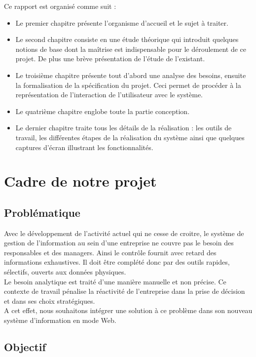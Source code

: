 \documentclass[a4paper,10pt]{article}
\begin{document}
\par
Ce rapport est organisé comme suit :\\
\begin{itemize}

\item Le premier chapitre  présente  l'organisme  d'accueil  et le sujet à traiter.
\item Le second chapitre  consiste en une étude théorique  qui introduit quelques notions de base dont la maîtrise  est indispensable  pour le déroulement  de ce projet.  De plus une brève présentation de l'étude  de l'existant.
\item Le troisième  chapitre  présente  tout  d'abord  une  analyse  des besoins, ensuite  la formalisation de la spécification  du projet. Ceci permet de procéder à la représentation de l'interaction de l'utilisateur avec le système.
\item Le quatrième  chapitre  englobe toute  la partie  conception.
\item Le dernier  chapitre  traite  tous  les détails  de la réalisation : les outils  de travail, les différentes étapes de la réalisation  du système ainsi que quelques captures  d'écran illustrant les fonctionnalités.
\end{itemize}
\newpage
\section{Cadre de notre projet}

\subsection{Problématique}

Avec le développement de l’activité actuel qui ne cesse de croitre, le système de gestion de l’information au sein d’une entreprise ne couvre pas le besoin des responsables et des managers. Ainsi le contrôle fournit avec retard des informations exhaustives. Il doit être complété donc par des outils rapides, sélectifs, ouverts aux données physiques.\\
Le besoin analytique est traité d'une manière manuelle et non précise. Ce contexte de travail pénalise la réactivité de l'entreprise dans la prise de décision et dans ses choix stratégiques.\\
A cet effet, nous souhaitons  intégrer une solution à ce problème dans son nouveau système d'information en mode Web.

\subsection{Objectif}
\end{document}

